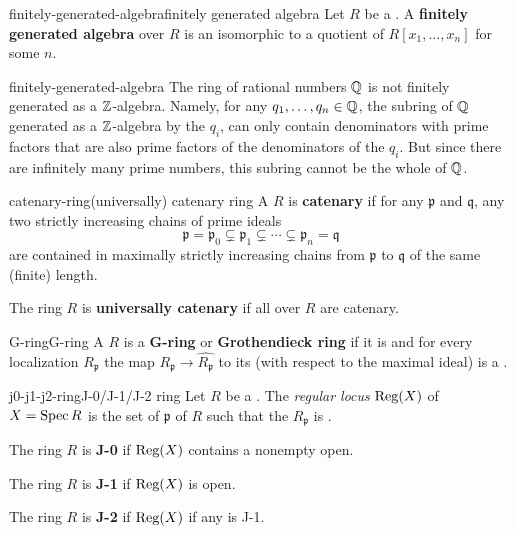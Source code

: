 \begin{topic}{finitely-generated-algebra}{finitely generated algebra}
    Let $R$ be a . A \textbf{finitely generated algebra} over $R$ is an  isomorphic to a quotient of $R[x_1, \ldots, x_n]$ for some $n$.
\end{topic}

\begin{example}{finitely-generated-algebra}
    The ring of rational numbers $\mathbb{Q}$ is not finitely generated as a $\mathbb{Z}$-algebra. Namely, for any $q_1, \ldots, q_n \in \mathbb{Q}$, the subring of $\mathbb{Q}$ generated as a $\mathbb{Z}$-algebra by the $q_i$, can only contain denominators with prime factors that are also prime factors of the denominators of the $q_i$. But since there are infinitely many prime numbers, this subring cannot be the whole of $\mathbb{Q}$.
\end{example}

\begin{topic}{catenary-ring}{(universally) catenary ring}
    A  $R$ is \textbf{catenary} if for any  $\mathfrak{p}$ and $\mathfrak{q}$, any two strictly increasing chains of prime ideals
    \[ \mathfrak{p} = \mathfrak{p}_0 \subsetneq \mathfrak{p}_1 \subsetneq \cdots \subsetneq \mathfrak{p}_n = \mathfrak{q} \]
    are contained in maximally strictly increasing chains from $\mathfrak{p}$ to $\mathfrak{q}$ of the same (finite) length.
    
    The ring $R$ is \textbf{universally catenary} if all  over $R$ are catenary.
\end{topic}

\begin{topic}{G-ring}{G-ring}
    A  $R$ is a \textbf{G-ring} or \textbf{Grothendieck ring} if it is  and for every localization $R_{\mathfrak{p}}$ the map $R_{\mathfrak{p}} \to \widehat{R_{\mathfrak{p}}}$ to its  (with respect to the maximal ideal) is a .
\end{topic}

\begin{topic}{j0-j1-j2-ring}{J-0/J-1/J-2 ring}
    Let $R$ be a  . The \textit{regular locus} $\textup{Reg}(X)$ of $X = \operatorname{Spec} R$ is the set of  $\mathfrak{p}$ of $R$ such that the  $R_\mathfrak{p}$ is .
    
    The ring $R$ is \textbf{J-0} if $\textup{Reg}(X)$ contains a nonempty open.
    
    The ring $R$ is \textbf{J-1} if $\textup{Reg}(X)$ is open.
    
    The ring $R$ is \textbf{J-2} if $\textup{Reg}(X)$ if any  is J-1.
\end{topic}

